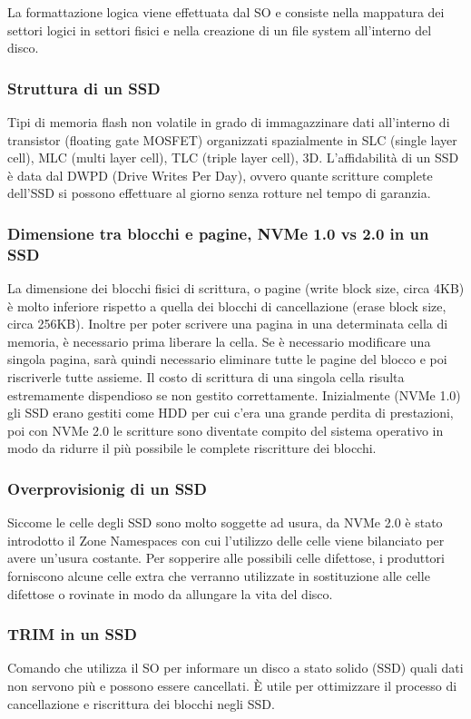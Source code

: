 \documentclass[a4paper]{article}
\begin{document}
La formattazione logica viene effettuata dal SO e consiste nella mappatura dei settori logici in settori fisici e nella creazione
di un file system all'interno del disco.

\subsubsection*{Struttura di un SSD}
Tipi di memoria flash non volatile in grado di immagazzinare dati all'interno di transistor (floating gate MOSFET) organizzati
spazialmente in SLC (single layer cell), MLC (multi layer cell), TLC (triple layer cell), 3D. L'affidabilità di un SSD è data dal DWPD (Drive
Writes Per Day), ovvero quante scritture complete dell'SSD si possono effettuare al giorno senza rotture nel tempo di garanzia.

\subsubsection*{Dimensione tra blocchi e pagine, NVMe 1.0 vs 2.0 in un SSD}
La dimensione dei blocchi fisici di scrittura, o pagine (write block size, circa 4KB) è molto inferiore rispetto a quella dei
blocchi di cancellazione (erase block size, circa 256KB). Inoltre per poter scrivere una pagina in una determinata cella di
memoria, è necessario prima liberare la cella. Se è necessario modificare una singola pagina, sarà quindi necessario eliminare
tutte le pagine del blocco e poi riscriverle tutte assieme. Il costo di scrittura di una singola cella risulta estremamente
dispendioso se non gestito correttamente. Inizialmente (NVMe 1.0) gli SSD erano gestiti come HDD per cui c'era una grande
perdita di prestazioni, poi con NVMe 2.0 le scritture sono diventate compito del sistema operativo in modo da ridurre il più
possibile le complete riscritture dei blocchi.

\subsubsection*{Overprovisionig di un SSD}
Siccome le celle degli SSD sono molto soggette ad usura, da NVMe 2.0 è stato introdotto il Zone Namespaces con cui l'utilizzo
delle celle viene bilanciato per avere un'usura costante. Per sopperire alle possibili celle difettose, i produttori forniscono
alcune celle extra che verranno utilizzate in sostituzione alle celle difettose o rovinate in modo da allungare la vita del disco.

\subsubsection*{TRIM in un SSD}
Comando che utilizza il SO per informare un disco a stato solido (SSD) quali dati non servono più e possono essere cancellati.
È utile per ottimizzare il processo di cancellazione e riscrittura dei blocchi negli SSD.
\end{document}
